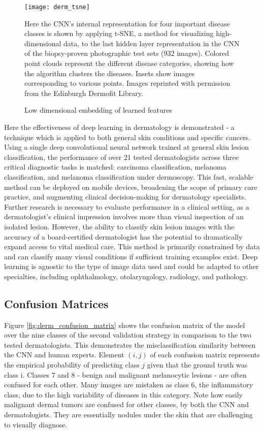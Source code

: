 \begin{figure}
\texttt{[image: derm\_tsne]}
\caption{Low dimensional embedding of learned features}
\vspace{12px}
Here the CNN’s internal representation for four important disease classes is shown by applying t-SNE, a method for visualizing high-dimensional data, to the last hidden layer representation in the CNN of the biopsy-proven photographic test sets (932 images). Colored point clouds represent the different disease categories, showing how the algorithm clusters the diseases. Insets show images corresponding to various points. Images reprinted with permission from the Edinburgh Dermofit Library.
\label{fig:derm_tsne}
\end{figure}

Here the effectiveness of deep learning in dermatology is demonstrated - a technique which is applied to both general skin conditions and specific cancers. Using a single deep convolutional neural network trained at general skin lesion classification, the performance of over 21 tested dermatologists across three critical diagnostic tasks is matched: carcinoma classification, melanoma classification, and melanoma classification under dermoscopy. This fast, scalable method can be deployed on mobile devices, broadening the scope of primary care practice, and augmenting clinical decision-making for dermatology specialists. Further research is necessary to evaluate performance in a clinical setting, as a dermatologist’s clinical impression involves more than visual inspection of an isolated lesion. However, the ability to classify skin lesion images with the accuracy of a board-certified dermatologist has the potential to dramatically expand access to vital medical care. This method is primarily constrained by data and can classify many visual conditions if sufficient training examples exist. Deep learning is agnostic to the type of image data used and could be adapted to other specialties, including ophthalmology, otolaryngology, radiology, and pathology. 

\subsection{Confusion Matrices}
Figure \ref{fig:derm_confusion_matrix} shows the confusion matrix of the model over the nine classes of the second validation strategy in comparison to the two tested dermatologists. This demonstrates the misclassification similarity between the CNN and human experts. Element $(i, j)$ of each confusion matrix represents the empirical probability of predicting class $j$ given that the ground truth was class i. Classes 7 and 8 - benign and malignant melanocytic lesions - are often confused for each other. Many images are mistaken as class 6, the inflammatory class, due to the high variability of diseases in this category. Note how easily malignant dermal tumors are confused for other classes, by both the CNN and dermatologists. They are essentially nodules under the skin that are challenging to visually diagnose.

